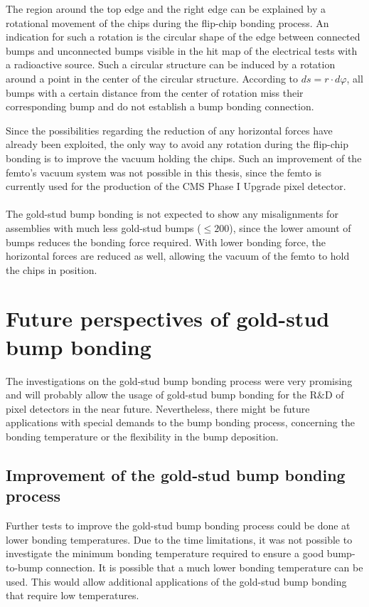 The region around the top edge and the right edge can be explained by a rotational movement of the chips during the flip-chip bonding process. An indication for such a rotation is the circular shape of the edge between connected bumps and unconnected bumps visible in the hit map of the electrical tests with a radioactive source. Such a circular structure can be induced by a rotation around a point in the center of the circular structure. According to $ds=r\cdot d\varphi$, all bumps with a certain distance from the center of rotation miss their corresponding bump and do not establish a bump bonding connection.

Since the possibilities regarding the reduction of any horizontal forces have already been exploited, the only way to avoid any rotation during the flip-chip bonding is to improve the vacuum holding the chips. Such an improvement of the femto's vacuum system was not possible in this thesis, since the femto is currently used for the production of the \ac{CMS} Phase I Upgrade pixel detector.
\\
\\
The gold-stud bump bonding is not expected to show any misalignments for assemblies with much less gold-stud bumps ($\leq 200$), since the lower amount of bumps reduces the bonding force required. With lower bonding force, the horizontal forces are reduced as well, allowing the vacuum of the femto to hold the chips in position.

 
\section{Future perspectives of gold-stud bump bonding}\label{sec:gold-stud_outlook}
The investigations on the gold-stud bump bonding process were very promising and will probably allow the usage of gold-stud bump bonding for the R$\&$D of pixel detectors in the near future. Nevertheless, there might be future applications with special demands to the bump bonding process, concerning the bonding temperature or the flexibility in the bump deposition.

\subsection{Improvement of the gold-stud bump bonding process}

Further tests to improve the gold-stud bump bonding process could be done at lower bonding temperatures. Due to the time limitations, it was not possible to investigate the minimum bonding temperature required to ensure a good bump-to-bump connection. It is possible that a much lower bonding temperature can be used. This would allow additional applications of the gold-stud bump bonding that require low temperatures.

